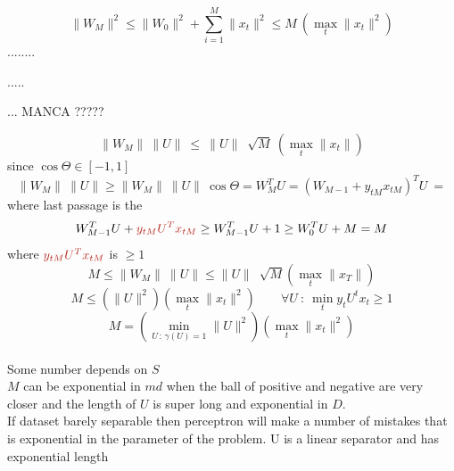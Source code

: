 \documentclass[../main.tex]{subfiles}
\begin{document}
$$
\| W_M\|^2 \leq \| W_0 \| ^2 + \sum_{i=1}^{M} \|x_t  \|^2 \leq M \ \left( \max_t \| x_t \|^2 \right)
$$
........

.....

...
MANCA  ?????

$$
\| W_M\| \ \|U \| \  \leq \ \| U \| \ \sqrt[]{M} \ \left( \max_t \| x_t \|\right)
$$
since $\cos \Theta \in \left[-1,1\right]$
$$
\|W_M \| \ \| U \| \geq \| W_M \| \ \| U\| \ \cos \Theta = W_M^T U = \left( W_{M-1} + y_{tM} x_{tM} \right)^T U \ = 
$$
where last passage is the 
\\
$$
W^T_{M-1} U + \red{y_{tM} U^T x_{tM} } \geq W_{M-1}^T U +1 \geq W_0^T U + M = M
$$
where $\red{y_{tM} U^T x_{tM} }$ is $\geq 1$
$$
M \leq \| W_M \| \ \| U \| \leq \| U \| \ \sqrt[]{M} \left( \max_t \| x_T \| \right)
$$
$$
M \leq \left( \| U\|^2 \right) \left( \max_t \|x_t\|^2 \right) \qquad \forall U \ : \ \min_t y_t U^t x_t \geq 1
$$
$$
M = \left( \min_{U \, : \, \gamma(U) = 1} \| U \|^2 \right) \left( \max_t \| x_t \|^2 \right)
$$\\
Some number depends on $S$
\\
$M$ can be exponential in $md$ when the ball of positive and negative are very closer and the length of $U$ is super long and exponential in $D$.
\\
If dataset barely separable then perceptron will make a number of mistakes that is exponential in the parameter of the problem. 
U is a linear separator and has exponential length
\end{document}
